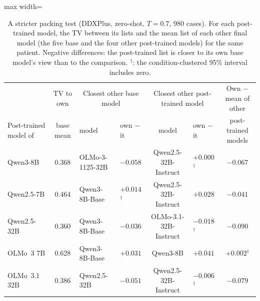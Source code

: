 \documentclass[wcp]{jmlr}
\begin{document}
\begin{table}[t]
\centering\small
\begin{adjustbox}{max width=\linewidth}
\begin{tabular}{lcllclc}
\toprule
 & TV to own & \multicolumn{2}{c}{Closest other base model} & \multicolumn{2}{c}{Closest other post-trained model} & Own $-$ mean of other \\
Post-trained model of & base mean & model & own $-$ it & model & own $-$ it & post-trained models \\
\midrule
Qwen3-8B & 0.368 & OLMo-3-1125-32B & $-0.058$ & Qwen2.5-32B-Instruct & $+0.000$$^{\dagger}$ & $-0.067$ \\
Qwen2.5-7B & 0.464 & Qwen3-8B-Base & $+0.014$$^{\dagger}$ & Qwen2.5-32B-Instruct & $+0.028$ & $-0.041$ \\
Qwen2.5-32B & 0.360 & Qwen3-8B-Base & $-0.036$ & OLMo-3.1-32B-Instruct & $-0.018$$^{\dagger}$ & $-0.090$ \\
OLMo~3 7B & 0.628 & Qwen3-8B-Base & $+0.031$ & Qwen3-8B & $+0.041$ & $+0.002$$^{\dagger}$ \\
OLMo~3.1 32B & 0.386 & Qwen2.5-32B & $-0.051$ & Qwen2.5-32B-Instruct & $-0.006$$^{\dagger}$ & $-0.079$ \\
\bottomrule
\end{tabular}
\end{adjustbox}
\caption{A stricter packing test (DDXPlus, zero-shot, $T{=}0.7$, 980 cases). For each post-trained model, the TV between its lists and the mean list of each other final model (the five base and the four other post-trained models) for the same patient. Negative differences: the post-trained list is closer to its own base model's view than to the comparison. $^{\dagger}$: the condition-clustered 95\% interval includes zero.}
\label{tab:packstrict}
\end{table}
\end{document}
